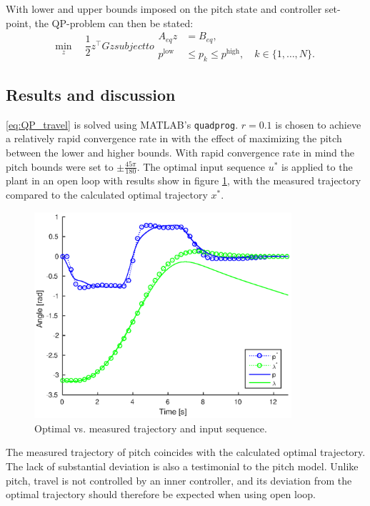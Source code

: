 With lower and upper bounds imposed on the pitch state and controller set-point, the QP-problem can then be stated:
\begin{subequations}
\label{eq:QP_travel}
\begin{equation}
	\min_z \quad \frac{1}{2} z^\top G z
\end{equation}
	subject to
\begin{align}
	A_{eq} z &= B_{eq}, \\
	p^{\textrm{low}} &\le p_k \le p^{\textrm{high}}, \quad k \in \{1, \dots, N\}.
\end{align}
\end{subequations}

\subsection{Results and discussion}
\eqref{eq:QP_travel} is solved using MATLAB's \texttt{quadprog}. $r = 0.1$ is chosen to achieve a relatively rapid convergence rate in with the effect of maximizing the pitch between the lower and higher bounds. With rapid convergence rate in mind the pitch bounds were set to $\pm\frac{45 \pi}{180}$. The optimal input sequence $u^*$ is applied to the plant in an open loop with results show in figure \ref{fig:opt_openloop}, with the measured trajectory compared to the calculated optimal trajectory $x^*$.

\begin{figure}[hp]
	\centering
		\includegraphics[width=0.85\textwidth]{figures/2/openloop.eps}
	\caption{Optimal vs. measured trajectory and input sequence.}
	\label{fig:opt_openloop}
\end{figure}

The measured trajectory of pitch coincides with the calculated optimal trajectory. The lack of substantial deviation is also a testimonial to the pitch model. Unlike pitch, travel is not controlled by an inner controller, and its deviation from the optimal trajectory should therefore be expected when using open loop.

